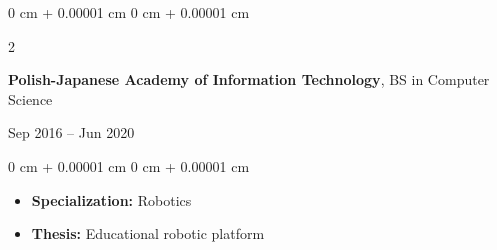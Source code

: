 \documentclass[10pt, letterpaper]{article}
\newenvironment{highlights}{
  \begin{itemize}[
        topsep=0.05 cm,
        parsep=0.05 cm,
        partopsep=0pt,
        itemsep=0pt,
        leftmargin=0 cm + 10pt
      ]
    }{
  \end{itemize}
} %
\newenvironment{onecolentry}{
  \begin{adjustwidth}{
      0 cm + 0.00001 cm
    }{
      0 cm + 0.00001 cm
    }
  }{
  \end{adjustwidth}
} %
\newenvironment{twocolentry}[2][]{
  \onecolentry
  \def\secondColumn{#2}
  \setcolumnwidth{\fill, 4.5 cm}
  \begin{paracol}{2}
  }{
    \switchcolumn \raggedleft \secondColumn
  \end{paracol}
  \endonecolentry
} %
\begin{document}
\vspace{0.1 cm}

\begin{twocolentry}
  { Sep 2016 – Jun 2020 }
  \textbf{Polish-Japanese Academy of Information Technology},
  BS in Computer Science
\end{twocolentry}
\vspace{0.1 cm}
\begin{onecolentry}
  \begin{highlights}
  \item \textbf{Specialization:} Robotics
  \item \textbf{Thesis:} Educational robotic platform
  \end{highlights}
\end{onecolentry}
\end{document}
